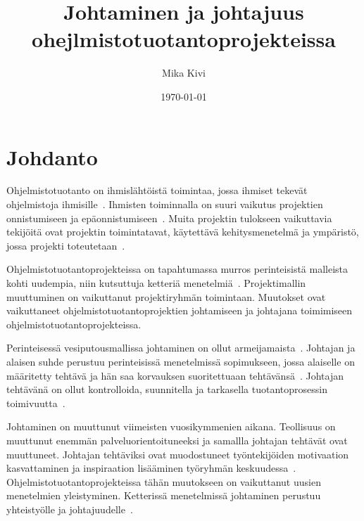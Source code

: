 \documentclass[finnish]{tktltiki2}
\title{Johtaminen ja johtajuus ohejlmistotuotantoprojekteissa}
\author{Mika Kivi}
\date{\today}
\theoremstyle{definition}
\theoremstyle{remark}
\begin{document}

\maketitle        %
\makeabstract     %

\tableofcontents  %
\thispagestyle{empty}
\newpage          %



\setcounter{page}{1}
\section{Johdanto}


Ohjelmistotuotanto on ihmislähtöistä toimintaa, jossa ihmiset tekevät ohjelmistoja ihmisille~\cite{Wang:2010:PPP:1810295.1810302}. Ihmisten toiminnalla on suuri vaikutus projektien onnistumiseen ja epäonnistumiseen~\cite{Wang:2009:PMP:1639950.1640049}. Muita projektin tulokseen vaikuttavia tekijöitä ovat projektin toimintatavat, käytettävä kehitysmenetelmä ja ympäristö, jossa projekti toteutetaan~\cite{McLeod:2011:FAS:1978802.1978803}.

Ohjelmistotuotantoprojekteissa on tapahtumassa murros perinteisistä malleista kohti uudempia, niin kutsuttuja ketteriä menetelmiä~\cite{Chow2008961}.  Projektimallin muuttuminen on vaikuttanut projektiryhmän toimintaan. Muutokset ovat vaikuttaneet ohjelmistotuotantoprojektien johtamiseen ja johtajana toimimiseen ohjelmistotuotantoprojekteissa.

Perinteisessä vesiputousmallissa johtaminen on ollut armeijamaista~\cite{Nerur:2005:CMA:1060710.1060712}. Johtajan ja alaisen suhde perustuu perinteisissä menetelmissä sopimukseen, jossa alaiselle on määritetty tehtävä ja hän saa korvauksen suoritettuaan tehtävänsä~\cite{thite2000leadership}. Johtajan tehtävänä on ollut kontrolloida, suunnitella ja tarkasella tuotantoprosessin toimivuutta~\cite{palmer2001emotional}. 

Johtaminen on muuttunut viimeisten vuosikymmenien aikana. Teollisuus on muuttunut enemmän palveluorientoituneeksi ja samallla johtajan tehtävät ovat muuttuneet. Johtajan tehtäviksi ovat muodostuneet työntekijöiden motivaation kasvattaminen ja inspiraation lisääminen työryhmän keskuudessa~\cite{palmer2001emotional}.  Ohjelmistotuotantoprojekteissa tähän muutokseen on vaikuttanut uusien menetelmien yleistyminen. Ketterissä menetelmissä johtaminen perustuu yhteistyölle ja johtajuudelle~\cite{Nerur:2005:CMA:1060710.1060712}. 
\end{document}
